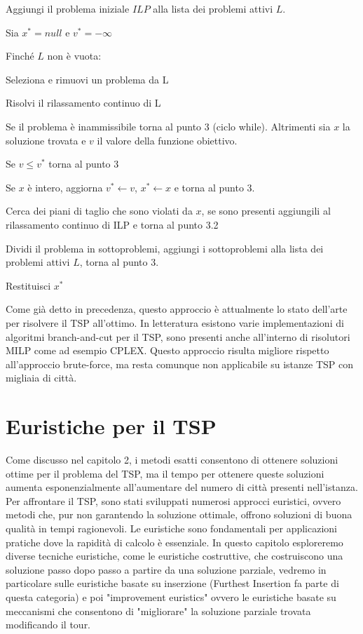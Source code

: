 \documentclass[a4paper,12pt]{report}
\begin{document}
\begin{tcolorbox}[colframe=black,colback=white,boxrule=0.5pt, sharp corners, breakable]
\begin{legal}
  \item Aggiungi il problema iniziale $ILP$ alla lista dei problemi attivi $L$.
  \item Sia $x^* = null$ e $v^* = -\infty$
  \item Finché $L$ non è vuota:
  \begin{legal}
    \item Seleziona e rimuovi un problema da L
    \item Risolvi il rilassamento continuo di L
    \item Se il problema è inammissibile torna al punto 3 (ciclo while). Altrimenti sia $x$ la soluzione trovata e $v$ il valore della funzione obiettivo.
    \item Se $v \leq v^*$ torna al punto 3
    \item Se $x$ è intero, aggiorna $v^* \leftarrow v$, $x^* \leftarrow x$ e torna al punto 3.
    \item Cerca dei piani di taglio che sono violati da $x$, se sono presenti aggiungili al rilassamento continuo di ILP e torna al punto 3.2
    \item Dividi il problema in sottoproblemi, aggiungi i sottoproblemi alla lista dei problemi attivi $L$, torna al punto 3.
  \end{legal}
  \item Restituisci $x^*$


\end{legal}
\end{tcolorbox}
\hfill \break
Come già detto in precedenza, questo approccio è attualmente lo stato dell'arte per risolvere il TSP all'ottimo. In letteratura esistono varie implementazioni di algoritmi branch-and-cut per il TSP\cite{Branch and Cut Algoritmhs}, sono presenti anche all'interno di risolutori MILP come ad esempio CPLEX. Questo approccio risulta migliore rispetto all'approccio brute-force, ma resta comunque non applicabile su istanze TSP con migliaia di città.

\chapter{Euristiche per il TSP}
Come discusso nel capitolo 2, i metodi esatti consentono di ottenere soluzioni ottime per il problema del TSP, ma il tempo per ottenere queste soluzioni aumenta esponenzialmente all'aumentare del numero di città presenti nell'istanza. Per affrontare il TSP, sono stati sviluppati numerosi approcci euristici, ovvero metodi che, pur non garantendo la soluzione ottimale, offrono soluzioni di buona qualità in tempi ragionevoli. Le euristiche sono fondamentali per applicazioni pratiche dove la rapidità di calcolo è essenziale. In questo capitolo esploreremo diverse tecniche euristiche, come le euristiche costruttive, che costruiscono una soluzione passo dopo passo a partire da una soluzione parziale, vedremo in particolare sulle euristiche basate su inserzione (Furthest Insertion fa parte di questa categoria) e poi "improvement euristics" ovvero le euristiche basate su meccanismi che consentono di "migliorare" la soluzione parziale trovata modificando il tour.
\end{document}
